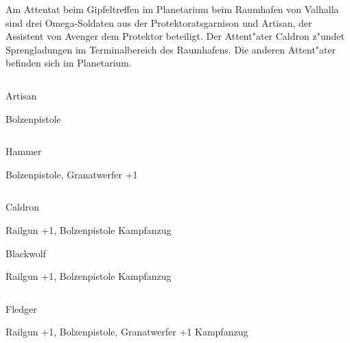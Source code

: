 
Am Attentat beim Gipfeltreffen im Planetarium beim Raumhafen von Valhalla sind drei Omega-Soldaten aus der Protektoratsgarnison und Artisan, der Assistent von Avenger dem Protektor beteiligt. Der Attent"ater Caldron z"undet Sprengladungen im Terminalbereich des Raumhafens. Die anderen Attent"ater befinden sich im Planetarium.

\begin{column}[l]{0.45}
    \begin{nscsheet}[h]{Artisan}
        \nscstats[ATT=2,AGG=2,DEX=2,COM=3]
        \nscruler
        \begin{nscinventory}
            \nscitem[Waffen] Bolzenpistole
        \end{nscinventory}
    \end{nscsheet}
\end{column}
\begin{column}[r]{0.45}
    \begin{nscsheet}[h]{Hammer}
        \nscstats[ATT=2,AGG=3,CON=2]
        \nscruler
        \begin{nscinventory}
            \nscitem[Waffen] Bolzenpistole, Granatwerfer +1            
        \end{nscinventory}
    \end{nscsheet}
\end{column}

\begin{column}[l]{0.45}
    \begin{nscsheet}[h]{Caldron}
        \nscstats[ATT=2,AGG=3,CON=2]
        \nscruler
        \begin{nscinventory}
            \nscitem[Waffen] Railgun +1, Bolzenpistole
            \nscitem[R"ustung] Kampfanzug
        \end{nscinventory}
    \end{nscsheet}

    \begin{nscsheet}[h]{Blackwolf}
        \nscstats[ATT=2,AGG=3,CON=2]
        \nscruler
        \begin{nscinventory}
            \nscitem[Waffen] Railgun +1, Bolzenpistole
            \nscitem[R"ustung] Kampfanzug
        \end{nscinventory}
    \end{nscsheet}    
\end{column}
\begin{column}[r]{0.45}
    \begin{nscsheet}[h]{Fledger}
        \nscstats[ATT=2,AGG=3,CON=2]
        \nscruler
        \begin{nscinventory}
            \nscitem[Waffen] Railgun +1, Bolzenpistole, Granatwerfer +1
            \nscitem[R"ustung] Kampfanzug
        \end{nscinventory}
    \end{nscsheet}        
\end{column}

